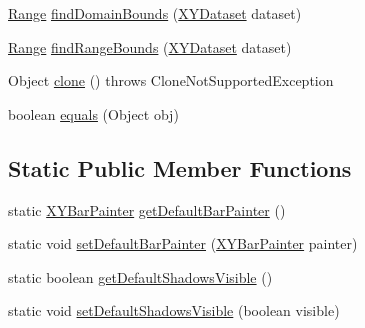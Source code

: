 \begin{DoxyCompactItemize}
\item 
\mbox{\hyperlink{classorg_1_1jfree_1_1data_1_1_range}{Range}} \mbox{\hyperlink{classorg_1_1jfree_1_1chart_1_1renderer_1_1xy_1_1_x_y_bar_renderer_a28042e2cf765d8fd827b924d06ba5143}{find\+Domain\+Bounds}} (\mbox{\hyperlink{interfaceorg_1_1jfree_1_1data_1_1xy_1_1_x_y_dataset}{X\+Y\+Dataset}} dataset)
\item 
\mbox{\hyperlink{classorg_1_1jfree_1_1data_1_1_range}{Range}} \mbox{\hyperlink{classorg_1_1jfree_1_1chart_1_1renderer_1_1xy_1_1_x_y_bar_renderer_a3514a82753d3430f16b2e933546d26cd}{find\+Range\+Bounds}} (\mbox{\hyperlink{interfaceorg_1_1jfree_1_1data_1_1xy_1_1_x_y_dataset}{X\+Y\+Dataset}} dataset)
\item 
Object \mbox{\hyperlink{classorg_1_1jfree_1_1chart_1_1renderer_1_1xy_1_1_x_y_bar_renderer_a7b6143619f3eddea64c89be127e307f0}{clone}} ()  throws Clone\+Not\+Supported\+Exception 
\item 
boolean \mbox{\hyperlink{classorg_1_1jfree_1_1chart_1_1renderer_1_1xy_1_1_x_y_bar_renderer_a74d4bd3576dcc160a006e4a1eb4f1119}{equals}} (Object obj)
\end{DoxyCompactItemize}
\subsection*{Static Public Member Functions}
\begin{DoxyCompactItemize}
\item 
static \mbox{\hyperlink{interfaceorg_1_1jfree_1_1chart_1_1renderer_1_1xy_1_1_x_y_bar_painter}{X\+Y\+Bar\+Painter}} \mbox{\hyperlink{classorg_1_1jfree_1_1chart_1_1renderer_1_1xy_1_1_x_y_bar_renderer_a08c02ef501d62efdb4a4a7ab36dfb9ec}{get\+Default\+Bar\+Painter}} ()
\item 
static void \mbox{\hyperlink{classorg_1_1jfree_1_1chart_1_1renderer_1_1xy_1_1_x_y_bar_renderer_a49dfa96648487f5a5297b02625ec8215}{set\+Default\+Bar\+Painter}} (\mbox{\hyperlink{interfaceorg_1_1jfree_1_1chart_1_1renderer_1_1xy_1_1_x_y_bar_painter}{X\+Y\+Bar\+Painter}} painter)
\item 
static boolean \mbox{\hyperlink{classorg_1_1jfree_1_1chart_1_1renderer_1_1xy_1_1_x_y_bar_renderer_adc7256cc011739e14552e7abf8f454d0}{get\+Default\+Shadows\+Visible}} ()
\item 
static void \mbox{\hyperlink{classorg_1_1jfree_1_1chart_1_1renderer_1_1xy_1_1_x_y_bar_renderer_a664b110e52c74b44011d370d3e5f6b1a}{set\+Default\+Shadows\+Visible}} (boolean visible)
\end{DoxyCompactItemize}
